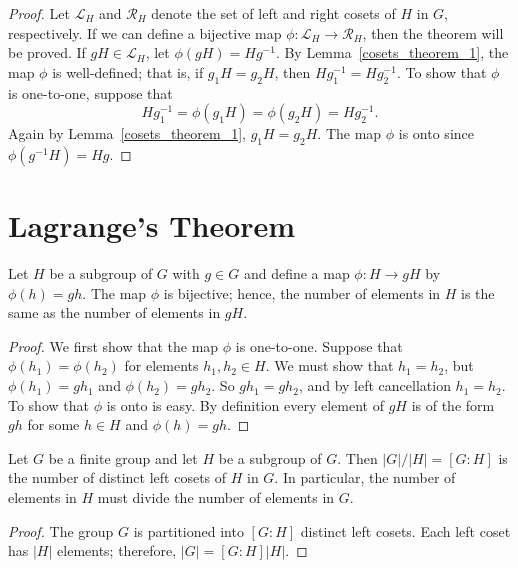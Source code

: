  
\begin{proof}
Let ${\mathcal L}_H$\label{notesetleft} and  ${\mathcal R}_H$\label{notesetright} denote the set of left and right cosets of $H$ in $G$, respectively.  If we can define a bijective map $\phi :  {\mathcal L}_H \rightarrow {\mathcal R}_H$, then the theorem will be proved.  If $gH \in {\mathcal L}_H$, let $\phi( gH ) = Hg^{-1}$.  By Lemma~\ref{cosets_theorem_1}, the map $\phi$ is well-defined; that is, if $g_1 H = g_2 H$, then $H g_1^{-1} = H g_2^{-1}$.  To show that $\phi$ is one-to-one, suppose that 
\[
H g_1^{-1} = \phi( g_1 H ) = \phi( g_2 H ) = H g_2^{-1}.
\]
Again by Lemma~\ref{cosets_theorem_1}, $g_1 H = g_2 H$.  The map $\phi$ is onto since $\phi(g^{-1} H ) = H g$. 
\hspace*{1in}
\end{proof}
 
 
\section{Lagrange's Theorem}

\begin{proposition}\label{cosets_theorem_4}
Let $H$ be a subgroup of $G$ with $g \in G$ and define a map $\phi:H \rightarrow gH$ by $\phi(h) = gh$.  The map $\phi$ is bijective; hence, the number of elements in $H$ is the same as the number of elements in $gH$. 
\end{proposition}
 
\begin{proof}
We first show that the map $\phi$ is one-to-one.  Suppose that $\phi(h_1)  = \phi(h_2)$ for elements $h_1, h_2 \in H$.  We must show that $h_1 =  h_2$, but $\phi(h_1) = gh_1$ and $\phi(h_2) = gh_2$.  So $gh_1 = gh_2$,  and by left cancellation $h_1= h_2$.  To show that $\phi$ is onto is easy.  By definition every element of $gH$ is of the form $gh$ for some $h \in H$ and $\phi(h) = gh$. 
\end{proof}

\begin{theorem}[Lagrange]\label{LagrangeTheorem}
Let $G$ be a finite group and let $H$ be a subgroup of $G$.  Then $|G|/|H| = [G : H]$ is the number of distinct left cosets of $H$ in $G$.  In particular, the number of elements in $H$ must divide the number of elements in $G$. 
\end{theorem}

\begin{proof}
The group $G$ is partitioned into $[G : H]$ distinct left cosets.  Each left coset has $|H|$ elements; therefore, $|G| = [G : H] |H|$.
\end{proof}

